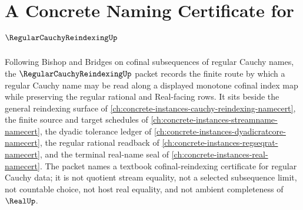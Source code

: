 \chapter{A Concrete Naming Certificate for $\RegularCauchyReindexingUp$}
\label{ch:concrete-instances-regular-cauchy-reindexing-namecert}

Following Bishop and Bridges on cofinal subsequences of regular Cauchy names, the $\RegularCauchyReindexingUp$ packet records the finite route by which a regular Cauchy name may be read along a displayed monotone cofinal index map while preserving the regular rational and Real-facing rows. It sits beside the general reindexing surface of \autoref{ch:concrete-instances-cauchy-reindexing-namecert}, the finite source and target schedules of \autoref{ch:concrete-instances-streamname-namecert}, the dyadic tolerance ledger of \autoref{ch:concrete-instances-dyadicratcore-namecert}, the regular rational readback of \autoref{ch:concrete-instances-regseqrat-namecert}, and the terminal real-name seal of \autoref{ch:concrete-instances-real-namecert}. The packet names a textbook cofinal-reindexing certificate for regular Cauchy data; it is not quotient stream equality, not a selected subsequence limit, not countable choice, not host real equality, and not ambient completeness of $\RealUp$.

